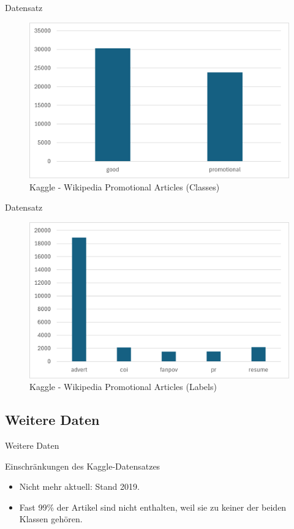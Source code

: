 \documentclass[aspectratio=169]{beamer} %
\begin{document}
\begin{frame}{Datensatz}
    \begin{figure}
        \centering
        \includegraphics[width=0.6\linewidth]{figures/kaggle-classes.png}
        \caption{Kaggle - Wikipedia Promotional Articles (Classes)}
    \end{figure}
\end{frame}

\begin{frame}{Datensatz}
    \begin{figure}
        \centering
        \includegraphics[width=0.6\linewidth]{figures/kaggle-promo-labels.png}
        \caption{Kaggle - Wikipedia Promotional Articles (Labels)}
    \end{figure}
\end{frame}

\subsection{Weitere Daten}

\begin{frame}{Weitere Daten}
    \begin{block}{Einschränkungen des Kaggle-Datensatzes}
        \begin{itemize}
            \item Nicht mehr aktuell: Stand 2019.
            \item Fast 99\% der Artikel sind nicht enthalten, weil sie zu keiner der beiden Klassen gehören.
        \end{itemize}
    \end{block}
\end{frame}
\end{document}
